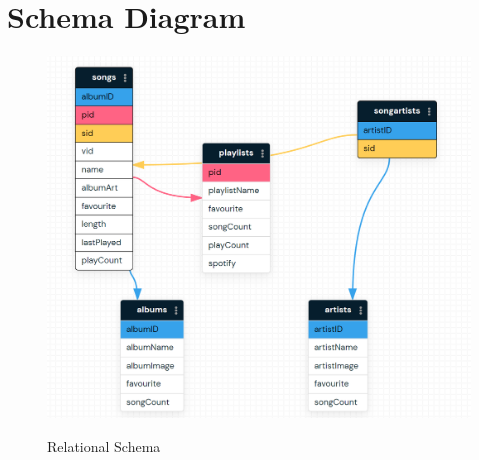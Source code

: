 \section{Schema Diagram}
\begin{figure}[H]
\centering
\caption{Relational Schema}
\includegraphics[scale=.5]{./schema.png}
\\[0.2in]
\label{fig:Relational Schema}
\end{figure}

\thispagestyle{fancy}